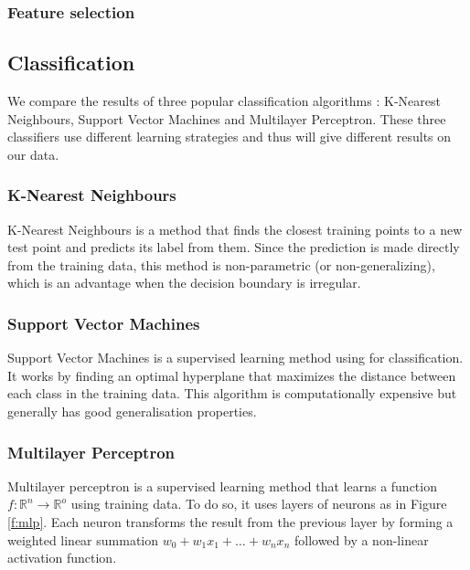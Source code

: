 \documentclass[letterpaper,11pt,leqno]{article}
\begin{document}
\subsubsection{Feature selection}

\subsection{Classification}

We compare the results of three popular classification algorithms : K-Nearest Neighbours, Support Vector Machines and Multilayer Perceptron. These three classifiers use different learning strategies and thus will give different results on our data.

\subsubsection{K-Nearest Neighbours}

K-Nearest Neighbours is a method that finds the closest training points to a new test point and predicts its label from them. Since the prediction is made directly from the training data, this method is non-parametric (or non-generalizing), which is an advantage when the decision boundary is irregular.


\subsubsection{Support Vector Machines}

Support Vector Machines is a supervised learning method using for classification. It works by finding an optimal hyperplane that maximizes the distance between each class in the training data. This algorithm is computationally expensive but generally has good generalisation properties.

\subsubsection{Multilayer Perceptron}

Multilayer perceptron is a supervised learning method that learns a function $f : \mathbb{R}^n \to \mathbb{R}^o$ using training data. To do so, it uses layers of neurons as in Figure \ref{f:mlp}. Each neuron transforms the result from the previous layer by forming a weighted linear summation $w_0 + w_1 x_1 + \dots + w_n x_n$ followed by a non-linear activation function.
\end{document}
